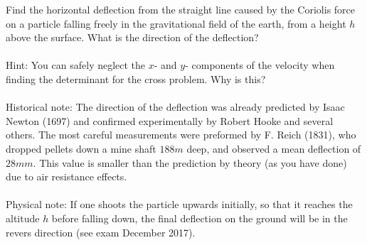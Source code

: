 \documentclass{article}
\begin{document}
    Find the horizontal deflection from the straight line caused by the Coriolis force on a particle falling freely in the gravitational field of the earth, from a height $h$ above the surface. What is the direction of the deflection?
    \\
    \\
    Hint: You can safely neglect the $x$- and $y$- components of the velocity when finding the determinant for the cross problem. Why is this?
    \\
    \\
    Historical note: The direction of the deflection was already predicted by Isaac Newton (1697) and confirmed experimentally by Robert Hooke and several others. The most careful measurements were preformed by F. Reich (1831), who dropped pellets down a mine shaft $188 \si{m}$ deep, and observed a mean deflection of $28 \si{mm}$. This value is smaller than the prediction by theory (as you have done) due to air resistance effects.
    \\
    \\
    Physical note: If one shoots the particle upwards initially, so that it reaches the altitude $h$ before falling down, the final deflection on the ground will be in the revers direction (see exam December 2017).
\end{document}
